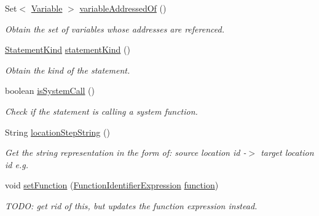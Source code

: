\begin{DoxyCompactItemize}
Set$<$ \hyperlink{interfaceedu_1_1udel_1_1cis_1_1vsl_1_1civl_1_1model_1_1IF_1_1variable_1_1Variable}{Variable} $>$ \hyperlink{classedu_1_1udel_1_1cis_1_1vsl_1_1civl_1_1model_1_1common_1_1statement_1_1CommonCallStatement_ab4cf1145d2eefe84c2748d144889f7d6}{variable\+Addressed\+Of} ()
\begin{DoxyCompactList}\small\item\em Obtain the set of variables whose addresses are referenced. \end{DoxyCompactList}\item 
\hyperlink{enumedu_1_1udel_1_1cis_1_1vsl_1_1civl_1_1model_1_1IF_1_1statement_1_1Statement_1_1StatementKind}{Statement\+Kind} \hyperlink{classedu_1_1udel_1_1cis_1_1vsl_1_1civl_1_1model_1_1common_1_1statement_1_1CommonCallStatement_a1c6acae09dbd516e69a4bd295f0d68a0}{statement\+Kind} ()
\begin{DoxyCompactList}\small\item\em Obtain the kind of the statement. \end{DoxyCompactList}\item 
boolean \hyperlink{classedu_1_1udel_1_1cis_1_1vsl_1_1civl_1_1model_1_1common_1_1statement_1_1CommonCallStatement_aec61f1537f3a8fb7c90c78e3736f659f}{is\+System\+Call} ()
\begin{DoxyCompactList}\small\item\em Check if the statement is calling a system function. \end{DoxyCompactList}\item 
String \hyperlink{classedu_1_1udel_1_1cis_1_1vsl_1_1civl_1_1model_1_1common_1_1statement_1_1CommonCallStatement_a132fa8eafb7bc855db5f593fc1466b8f}{location\+Step\+String} ()
\begin{DoxyCompactList}\small\item\em Get the string representation in the form of\+: source location id -\/$>$ target location id e.\+g. \end{DoxyCompactList}\item 
void \hyperlink{classedu_1_1udel_1_1cis_1_1vsl_1_1civl_1_1model_1_1common_1_1statement_1_1CommonCallStatement_a963a6fe132afcb92e899e1b6b6c4240a}{set\+Function} (\hyperlink{interfaceedu_1_1udel_1_1cis_1_1vsl_1_1civl_1_1model_1_1IF_1_1expression_1_1FunctionIdentifierExpression}{Function\+Identifier\+Expression} \hyperlink{classedu_1_1udel_1_1cis_1_1vsl_1_1civl_1_1model_1_1common_1_1statement_1_1CommonCallStatement_a9a4cad34320d6a01b85ec35887404aac}{function})
\begin{DoxyCompactList}\small\item\em T\+O\+D\+O\+: get rid of this, but updates the function expression instead. \end{DoxyCompactList}\end{DoxyCompactItemize}
